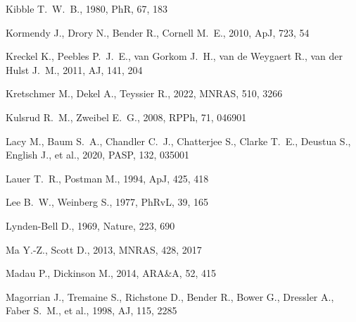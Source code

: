 \documentclass[fleqn,usenatbib]{mnras}
\begin{document}
\begin{thebibliography}{}
 Kibble T.~W.~B., 1980, PhR, 67, 183

 Kormendy J., Drory N., Bender R., Cornell M.~E., 2010, ApJ, 723, 54



 Kreckel K., Peebles P.~J.~E., van Gorkom J.~H., van de Weygaert R., van der Hulst J.~M., 2011, AJ, 141, 204

 Kretschmer M., Dekel A., Teyssier R., 2022, MNRAS, 510, 3266


 Kulsrud R.~M., Zweibel E.~G., 2008, RPPh, 71, 046901

 Lacy M., Baum S.~A., Chandler C.~J., Chatterjee S., Clarke T.~E., Deustua S., English J., et al., 2020, PASP, 132, 035001

 Lauer T.~R., Postman M., 1994, ApJ, 425, 418

 Lee B.~W., Weinberg S., 1977, PhRvL, 39, 165

 Lynden-Bell D., 1969, Nature, 223, 690

 Ma Y.-Z., Scott D., 2013, MNRAS, 428, 2017

 Madau P., Dickinson M., 2014, ARA\&A, 52, 415

 Magorrian J., Tremaine S., Richstone D., Bender R., Bower G., Dressler A., Faber S.~M., et al., 1998, AJ, 115, 2285


\end{thebibliography}
\end{document}
